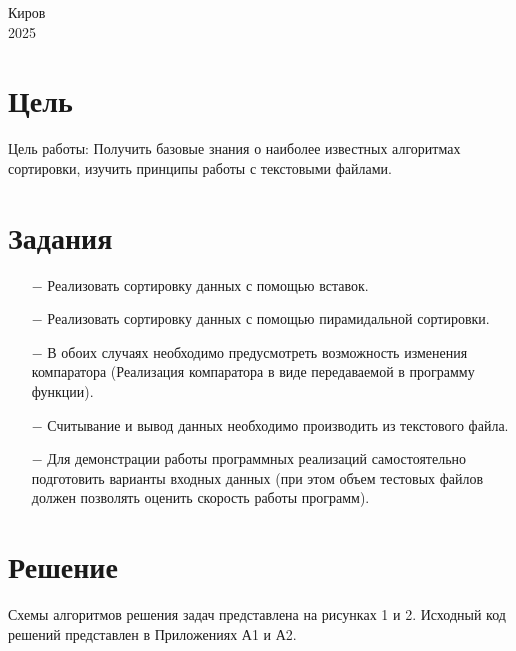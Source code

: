 \documentclass[oneside,a4paper,14pt]{extarticle}
\begin{document}
\begin{center}
	Киров\\
	2025
\end{center}

\newpage\thispagestyle{plain}

\section*{Цель}

Цель работы: Получить базовые знания о наиболее известных алгоритмах сортировки, изучить принципы работы с текстовыми файлами.

\section*{Задания}
\begin{itemize}
	\item[$-$] Реализовать сортировку данных с помощью вставок.
	\item[$-$] Реализовать сортировку данных с помощью пирамидальной сортировки.
	\item[$-$] В обоих случаях необходимо предусмотреть возможность изменения компаратора (Реализация компаратора в виде передаваемой в программу функции).
	\item[$-$] Считывание и вывод данных необходимо производить из текстового файла.
	\item[$-$] Для демонстрации работы программных реализаций самостоятельно подготовить варианты входных данных (при этом объем тестовых файлов должен позволять оценить скорость работы программ).
\end{itemize}

\section*{Решение}

Схемы алгоритмов решения задач представлена на рисунках 1 и 2. Исходный код решений представлен в Приложениях А1 и А2.
\end{document}
